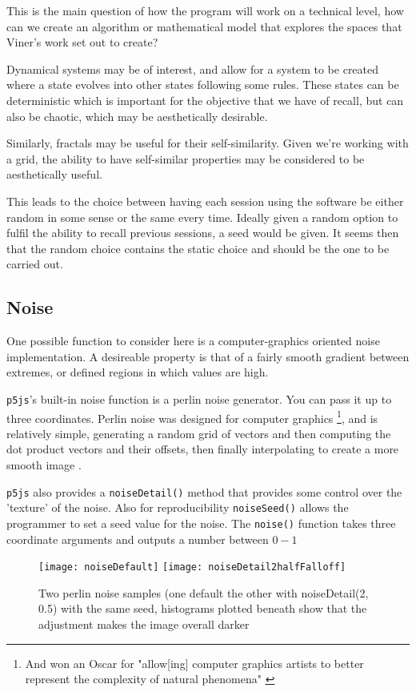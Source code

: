 This is the main question of how the program will work on a technical level, how
can we create an algorithm or mathematical model that explores the spaces that
Viner's work set out to create?

Dynamical systems may be of interest, and allow for a system to be created where
a state evolves into other states following some rules. These states can be
deterministic which is important for the objective that we have of recall, but
can also be chaotic, which may be aesthetically desirable.

Similarly, fractals may be useful for their self-similarity. Given we're working
with a grid, the ability to have self-similar properties may be considered to be
aesthetically useful.

This leads to the choice between having each session using the software be
either random in some sense or the same every time. Ideally given a random
option to fulfil the ability to recall previous sessions, a seed would be given.
It seems then that the random choice contains the static choice and should be
the one to be carried out.

\subsection{Noise}
One possible function to consider here is a computer-graphics oriented noise
implementation. A desireable property is that of a fairly smooth gradient
between extremes, or defined regions in which values are high.

\verb|p5js|'s built-in noise function is a perlin noise generator. You can pass
it up to three coordinates. Perlin noise was designed for computer graphics
\footnote{And won an Oscar for "allow[ing] computer graphics artists to better
represent the complexity of natural phenomena" \citep{nyu_perlin}}, and is relatively simple,
generating a random grid of vectors and then computing the dot product vectors
and their offsets, then finally interpolating to create a more smooth image
\citep{10.1145/566570.566636}.

\verb|p5js| also provides a \verb|noiseDetail()| method that provides some
control over the 'texture' of the noise. Also for reproducibility
\verb|noiseSeed()| allows the programmer to set a seed value for the noise.
The \verb|noise()| function takes three coordinate arguments and outputs a
number between $0-1$

\begin{figure}[H]
\centering
\texttt{[image: noiseDefault]}
\hspace{0.2cm}
\texttt{[image: noiseDetail2halfFalloff]}
\caption{Two perlin noise samples (one default the other with
noiseDetail(2, 0.5) with the same seed, histograms plotted beneath show
that the adjustment makes the image overall darker}
\end{figure}

